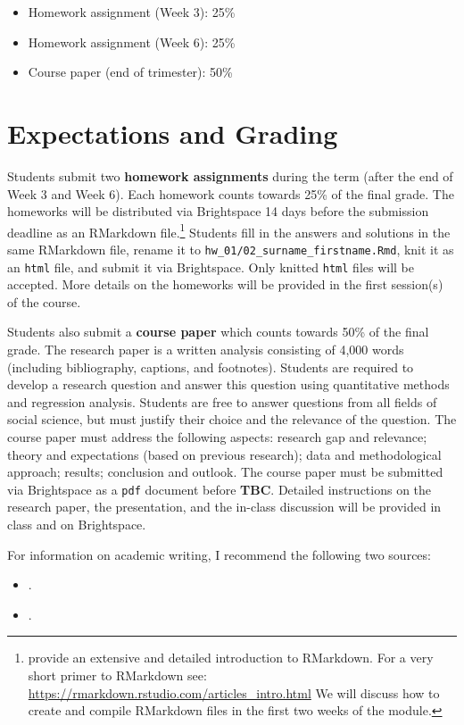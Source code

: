 \documentclass[abstract=on,parskip=full,headings=standardclasses,fontsize=11pt,paper=a4]{scrartcl}
\begin{document}
\begin{itemize}
\item Homework assignment (Week 3): 25\% 
\item Homework assignment  (Week 6): 25\% 
\item Course paper (end of trimester): 50\%
\end{itemize}


\section*{Expectations and Grading}


Students submit two \textbf{homework assignments} during the term (after the end of Week 3 and Week 6). Each homework counts towards 25\% of the final grade.  The homeworks will be distributed via Brightspace 14 days before the submission deadline as an RMarkdown file.\footnote{\textcite{xie18} provide an extensive and detailed introduction to RMarkdown. For a very short primer to RMarkdown see: \url{https://rmarkdown.rstudio.com/articles_intro.html} We will discuss how to create and compile RMarkdown files in the first two weeks of the module.} Students fill in the answers and solutions in the same RMarkdown file, rename it to \texttt{hw\_01/02\_surname\_firstname.Rmd}, knit it as an \texttt{html} file, and submit it via Brightspace. Only knitted \texttt{html} files will be accepted. More details on the homeworks will be provided in the first session(s) of the course.


Students also submit a \textbf{course paper} which counts towards 50\% of the final grade. The research paper is a written analysis consisting of 4,000 words (including bibliography, captions, and footnotes). Students are required to develop a research question and answer this question using quantitative methods and regression analysis. Students are free to answer questions from all fields of social science, but must justify their choice and the relevance of the question. The course paper must address the following aspects: research gap and relevance; theory and expectations (based on previous research); data and methodological approach; results; conclusion and outlook. The course paper must be submitted via Brightspace as a \texttt{pdf} document before \textbf{TBC}.  Detailed instructions on the research paper, the presentation, and the in-class discussion will be provided in class and on Brightspace.

For information on academic writing, I recommend the following two sources:
\begin{itemize}
\item {}.
\item {}.
\end{itemize}
\end{document}
